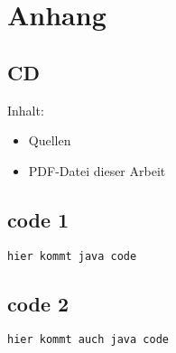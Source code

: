 
\chapter{Anhang}

		
\section{CD}
Inhalt:
\begin{itemize}
\item Quellen
\item PDF-Datei dieser Arbeit
\end{itemize}

\newpage


\section{code 1}\label{code1}
\begin{lstlisting}	
hier kommt java code
\end{lstlisting}	


\newpage
\section{code 2}\label{code2}

		
\begin{lstlisting}	
hier kommt auch java code

\end{lstlisting}